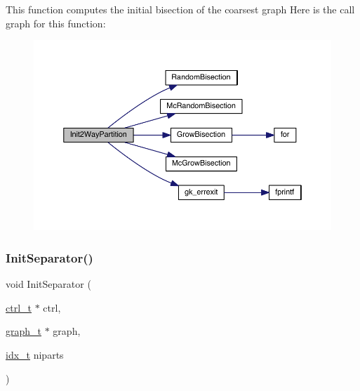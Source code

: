 This function computes the initial bisection of the coarsest graph Here is the call graph for this function\+:\nopagebreak
\begin{figure}[H]
\begin{center}
\leavevmode
\includegraphics[width=350pt]{a00903_af566aa1abb139c5b46b29c95b9ed075d_cgraph}
\end{center}
\end{figure}
\mbox{\label{a00903_a2927ed69df973d68e918bb74f75b0b70}} 
\subsubsection{\texorpdfstring{Init\+Separator()}{InitSeparator()}}
{\footnotesize\ttfamily void Init\+Separator (\begin{DoxyParamCaption}\item[{\hyperlink{a00742}{ctrl\+\_\+t} $\ast$}]{ctrl,  }\item[{\hyperlink{a00734}{graph\+\_\+t} $\ast$}]{graph,  }\item[{\hyperlink{a00876_aaa5262be3e700770163401acb0150f52}{idx\+\_\+t}}]{niparts }\end{DoxyParamCaption})}

